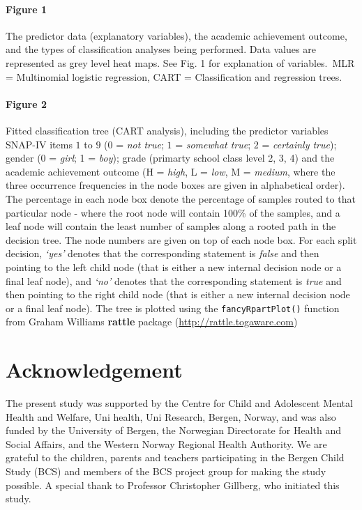 \documentclass[10pt,letterpaper]{article}
\begin{document}
\vspace{5mm}

\paragraph{Figure 1} The predictor data (explanatory variables), the academic achievement outcome, and the types of classification analyses being performed. 
Data values are represented as grey level heat maps. See 
Fig. 1 for explanation of variables.\,
MLR = Multinomial logistic regression, CART = Classification and regression trees. \\



\vspace{5mm}

\paragraph{Figure 2} Fitted classification tree (CART analysis),  including the predictor variables SNAP-IV items $1$ to $9$ ($0$ = \emph{not true}; $1$ = \emph{somewhat true};
 $2$ = \emph{certainly true}); gender (0 = \emph{girl}; 1 = \emph{boy}); grade (primarty school class level 2, 3, 4) and the academic achievement outcome (H = \emph{high}, L = \emph{low},  M = \emph{medium}, where the three occurrence frequencies in the node boxes are given in alphabetical order). The percentage in each node box denote the
 percentage of samples routed to that particular node - where the root node will contain 100\% of the samples, and a leaf node will contain the least number of samples along 
 a rooted path in the decision tree.
The node numbers are given on top of each node box. For each split decision, \emph{`yes'} denotes that the corresponding statement is \emph{ false} 
and then pointing to the left child node
(that is either a new internal decision node or a final leaf node), and \emph{`no'}
denotes that the corresponding statement is \emph{true} and then pointing to the right child node (that is either a new internal decision node or a final leaf node).  
The tree is plotted using the {\small \tt fancyRpartPlot()} function from Graham Williams {\bf rattle} package
({\small \url{http://rattle.togaware.com}})


\section*{Acknowledgement}
The present study was supported by the Centre for Child and Adolescent Mental Health and Welfare, Uni health, Uni
Research, Bergen, Norway, and was also funded by the University of Bergen, the Norwegian Directorate for Health and
Social Affairs, and the Western Norway Regional Health Authority. We are grateful to the children, parents and teachers
participating in the Bergen Child Study (BCS) and members of the BCS project group for making the study possible. A
special thank to Professor Christopher Gillberg, who initiated this study.
\end{document}
